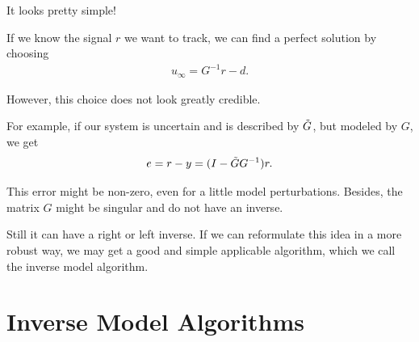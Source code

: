 It looks pretty simple! 

If we know the signal $r$ we want to track, we can find a perfect solution by choosing 
\begin{align}
u_\infty = G^{-1} r -d.
\end{align}

However, this choice does not look greatly  credible. 

For example, if our system is uncertain and is described by $\tilde{G}$, but modeled by $G$, we get 
\begin{align}
e = r - y = (I - \tilde{G} G^{-1} ) r. 
\end{align}

This error might be non-zero, even for a little model perturbations. 
Besides, the matrix $G$ might be singular and do not have an inverse. 

Still it can have a right or left inverse. 
If we can reformulate this idea in a more robust way, we may get a good and simple applicable algorithm, which we call the inverse model algorithm.

\section{Inverse Model Algorithms}

